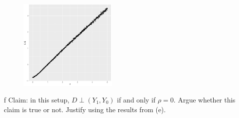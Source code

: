 \documentclass{article}
\begin{document}
\begin{solution}
\begin{figure}[htb]
    \includegraphics[width=0.43\textwidth]{ps1/Figures/p2_qe_param.pdf}
\end{figure}

\end{solution}
\begin{problem}{f}
Claim: in this setup, $D \perp\left(Y_{1}, Y_{0}\right)$ if and only if $\rho=0$. Argue whether this claim is true or not. Justify using the results from (e).
\end{problem}
\begin{solution}

\end{solution}


\newpage

\end{document}
